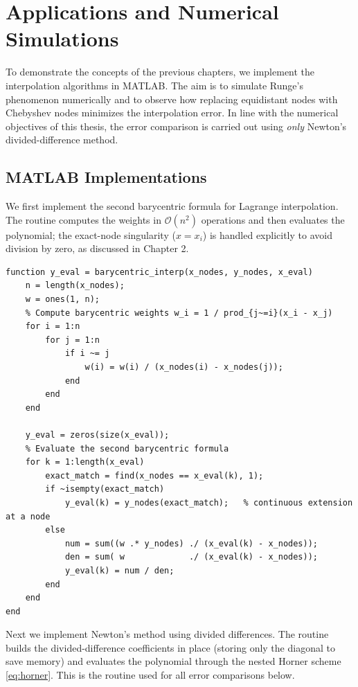 \documentclass[12pt, a4paper]{article}
\theoremstyle{plain}
\theoremstyle{definition}
\theoremstyle{remark}
\begin{document}
\newpage
\section{Applications and Numerical Simulations}

To demonstrate the concepts of the previous chapters, we implement the interpolation algorithms in MATLAB. The aim is to simulate Runge's phenomenon numerically and to observe how replacing equidistant nodes with Chebyshev nodes minimizes the interpolation error. In line with the numerical objectives of this thesis, the error comparison is carried out using \emph{only} Newton's divided-difference method.

\subsection{MATLAB Implementations}

We first implement the second barycentric formula for Lagrange interpolation. The routine computes the weights in $\mathcal{O}(n^2)$ operations and then evaluates the polynomial; the exact-node singularity ($x = x_i$) is handled explicitly to avoid division by zero, as discussed in Chapter 2.

\begin{lstlisting}[caption={Barycentric Lagrange interpolation.}, label={lst:bary}]
function y_eval = barycentric_interp(x_nodes, y_nodes, x_eval)
    n = length(x_nodes);
    w = ones(1, n);
    % Compute barycentric weights w_i = 1 / prod_{j~=i}(x_i - x_j)
    for i = 1:n
        for j = 1:n
            if i ~= j
                w(i) = w(i) / (x_nodes(i) - x_nodes(j));
            end
        end
    end

    y_eval = zeros(size(x_eval));
    % Evaluate the second barycentric formula
    for k = 1:length(x_eval)
        exact_match = find(x_nodes == x_eval(k), 1);
        if ~isempty(exact_match)
            y_eval(k) = y_nodes(exact_match);   % continuous extension at a node
        else
            num = sum((w .* y_nodes) ./ (x_eval(k) - x_nodes));
            den = sum( w             ./ (x_eval(k) - x_nodes));
            y_eval(k) = num / den;
        end
    end
end
\end{lstlisting}

Next we implement Newton's method using divided differences. The routine builds the divided-difference coefficients in place (storing only the diagonal to save memory) and evaluates the polynomial through the nested Horner scheme \eqref{eq:horner}. This is the routine used for all error comparisons below.
\end{document}
